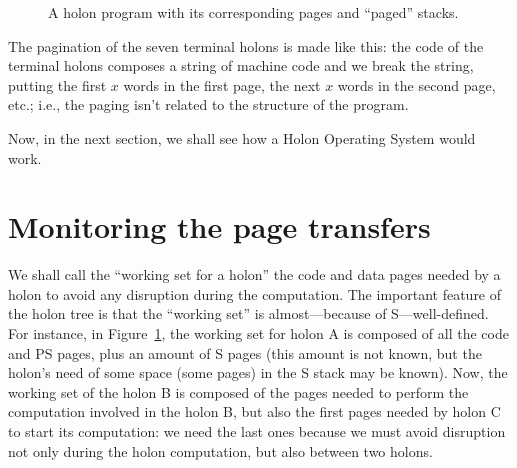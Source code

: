 \documentclass[openany,nobib]{tufte-book}
\begin{document}
\begin{figure}
    \caption{A holon program with its corresponding pages and ``paged''
stacks.}
    \label{fig:op}
\end{figure}

The pagination of the seven terminal holons is made like this: the code of the
terminal holons composes a string of machine code and we break the string,
putting the first $x$ words in the first page, the next $x$ words in the second
page, etc.; i.e., the paging isn't related to the structure of the program.

Now, in the next section, we shall see how a Holon Operating System would work.

\section{Monitoring the page transfers}

We shall call the ``working set for a holon'' the code and data pages needed by
a holon to avoid any disruption during the computation. The important feature
of the holon tree is that the ``working set'' is almost---because of
S---well-defined. For instance, in Figure~\ref{fig:op}, the working set for
holon A is composed of all the code and PS pages, plus an amount of S pages
(this amount is not known, but the holon's need of some space (some pages) in
the S stack may be known). Now, the working set of the holon B is composed of
the pages needed to perform the computation involved in the holon B, but also
the first pages needed by holon C to start its computation: we need the last
ones because we must avoid disruption not only during the holon computation,
but also between two holons.
\end{document}
